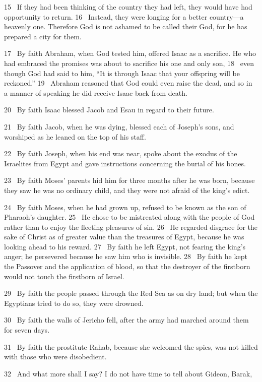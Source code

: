 15 
If they had been thinking of the country they had left, they would have had opportunity to return.
16 
Instead, they were longing for a better country—a heavenly one.
Therefore God is not ashamed
to be called their God,
for he has prepared a city
for them.
\par
17 
By faith Abraham, when God tested him, offered Isaac as a sacrifice.
He who had embraced the promises was about to sacrifice his one and only son,
18 
even though God had said to him, “It is through Isaac that your offspring will be reckoned.”
19 
Abraham reasoned that God could even raise the dead,
and so in a manner of speaking he did receive Isaac back from death.
\par
20 
By faith Isaac blessed Jacob and Esau in regard to their future.
\par
21 
By faith Jacob, when he was dying, blessed each of Joseph’s sons,
and worshiped as he leaned on the top of his staff.
\par
22 
By faith Joseph, when his end was near, spoke about the exodus of the Israelites from Egypt and gave instructions concerning the burial of his bones.
\par
23 
By faith Moses’ parents hid him for three months after he was born,
because they saw he was no ordinary child, and they were not afraid of the king’s edict.
\par
24 
By faith Moses, when he had grown up, refused to be known as the son of Pharaoh’s daughter.
25 
He chose to be mistreated
along with the people of God rather than to enjoy the fleeting pleasures of sin.
26 
He regarded disgrace
for the sake of Christ
as of greater value than the treasures of Egypt, because he was looking ahead to his reward.
27 
By faith he left Egypt,
not fearing the king’s anger; he persevered because he saw him who is invisible.
28 
By faith he kept the Passover and the application of blood, so that the destroyer
of the firstborn would not touch the firstborn of Israel.
\par
29 
By faith the people passed through the Red Sea as on dry land; but when the Egyptians tried to do so, they were drowned.
\par
30 
By faith the walls of Jericho fell, after the army had marched around them for seven days.
\par
31 
By faith the prostitute Rahab, because she welcomed the spies, was not killed with those who were disobedient.
\par
32 
And what more shall I say? I do not have time to tell about Gideon,
Barak,
